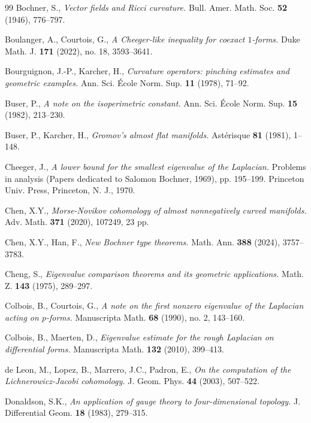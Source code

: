 \documentclass[12pt, twoside]{article}
\theoremstyle{definition}
\numberwithin{equation}{section}
\begin{document}
\begin{thebibliography}{99}
		Bochner, S.,  \emph{Vector fields and Ricci curvature.} Bull. Amer. Math. Soc. \textbf{52} (1946), 776--797.
		
		Boulanger, A., Courtois, G.,
		\textit{A Cheeger-like inequality for coexact $1$-forms.} 
		Duke Math. J. \textbf{171} (2022), no. 18, 3593--3641. 
		
		
	Bourguignon, J.-P., Karcher, H.,  \emph{Curvature operators: pinching estimates and geometric examples.} Ann. Sci. École Norm. Sup. \textbf{11} (1978), 71--92.
		
		Buser, P.,  \emph{A note on the isoperimetric constant.} Ann. Sci. École Norm. Sup. \textbf{15} (1982), 213--230.
		
		Buser, P., Karcher, H.,  \emph{Gromov's almost flat manifolds.} Astérisque \textbf{81} (1981), 1--148.
		
		Cheeger, J.,
		\emph{ A lower bound for the smallest eigenvalue of the Laplacian.} Problems in analysis (Papers dedicated to Salomon Bochner, 1969), pp. 195--199. Princeton Univ. Press, Princeton, N. J., 1970.
			
		
	Chen, X.Y., \emph{Morse-Novikov cohomology of almost nonnegatively curved manifolds.} Adv. Math. \textbf{371} (2020), 107249, 23 pp.
		
	
		
	Chen, X.Y., Han, F., \emph{New Bochner type theorems.} Math. Ann. \textbf{388} (2024), 3757--3783.
		
		Cheng, S., \emph{Eigenvalue comparison theorems and its geometric applications.} Math. Z. \textbf{143} (1975), 289--297.
		
		Colbois, B., Courtois, G.,
		\emph{A note on the first nonzero eigenvalue of the Laplacian acting on $p$-forms.}
		Manuscripta Math. \textbf{68} (1990), no. 2, 143--160. 
		
		Colbois, B., Maerten, D.,
		\emph{Eigenvalue estimate for the rough Laplacian on differential forms.}
		Manuscripta Math. \textbf{132} (2010), 399--413. 
		
		
		de Leon, M., Lopez, B., Marrero, J.C., Padron, E., \emph{On the computation of the Lichnerowicz-Jacobi cohomology.} J. Geom. Phys. \textbf{44} (2003), 507--522.
		
		Donaldson, S.K., \emph{An application of gauge theory to four-dimensional topology.} J. Differential Geom. \textbf{18} (1983), 279--315.
		

\end{thebibliography}
\end{document}
